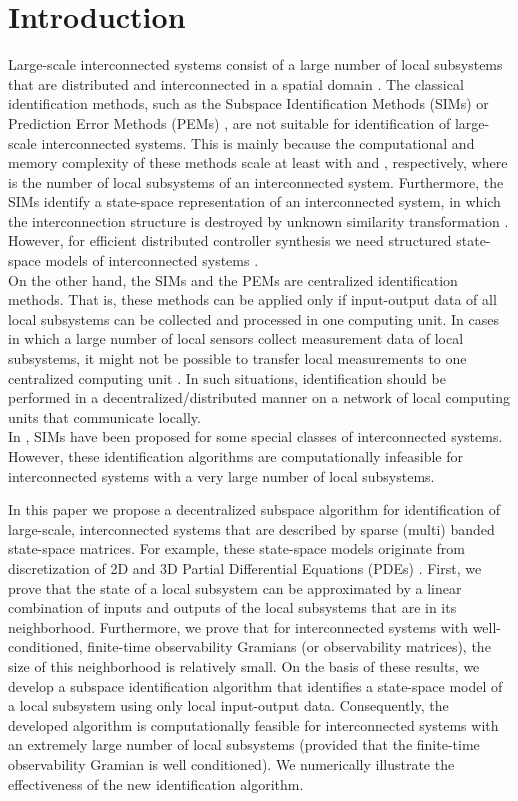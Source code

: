 \documentclass[journal,10pt]{IEEEtran}
\begin{document}
\section{Introduction}
Large-scale interconnected systems consist of a large number of local subsystems that are distributed and interconnected in a spatial domain \cite{benner2004,siljak1991,bamieh02distributedcontrol,dandrea2003}. The classical identification methods, such as the Subspace Identification Methods (SIMs) \cite{verhaegen2007} or Prediction Error Methods (PEMs) \cite{lennart1999system}, are not suitable for identification of large-scale interconnected systems. This is mainly because the computational and memory complexity of these methods scale at least with  and , respectively, where  is the number of local subsystems of an interconnected system. Furthermore, the SIMs identify a state-space representation of an interconnected system, in which the interconnection structure is destroyed by unknown similarity transformation \cite{verhaegen2007}. However, for efficient distributed controller synthesis we need structured state-space models of interconnected systems \cite{paolo2009paper,bamieh02distributedcontrol,dandrea2003,justin2010distributed}.
\\
 On the other hand, the SIMs and the PEMs are centralized identification methods.
That is, these methods can be applied only if input-output data of all local subsystems can be collected and processed in one computing unit. In cases in which a large number of local sensors collect measurement data of local subsystems, it might not be possible to transfer local measurements to one centralized computing unit \cite{Rabbat2004}. In such situations, identification should be performed in a decentralized/distributed manner on a network of local computing units that communicate locally.  
\\
In \cite{paolo2009ident,massioniCirculant}, SIMs have been proposed for some special classes of interconnected systems. However, these identification algorithms are computationally infeasible for interconnected systems with a very large number of local subsystems.
\par
In this paper we propose a decentralized subspace algorithm for identification of large-scale, interconnected systems that are described by sparse (multi) banded state-space matrices. For example, these state-space models originate from discretization of 2D and 3D Partial Differential Equations (PDEs) \cite{benner2004,haberThesis}. First, we prove that the state of a local subsystem can be approximated by a linear combination of inputs and outputs of the local subsystems that are in its neighborhood.  Furthermore, we prove that for interconnected systems with well-conditioned, finite-time observability Gramians (or observability matrices), the size of this neighborhood is relatively small. On the basis of these results, we develop a subspace identification algorithm that identifies a state-space model of a local subsystem using only local input-output data. Consequently, the developed algorithm is computationally feasible for interconnected systems with an extremely large number of local subsystems (provided that the finite-time observability Gramian is well conditioned). We numerically illustrate the effectiveness of the new identification algorithm. 
\end{document}
